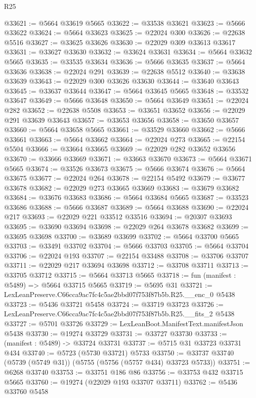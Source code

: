 \begin{lexlean}{R25}
\begin{coremodule}
@33621 := @5664 @33619 @5665
@33622 := @33538 @33621
@33623 := @5666 @33622
@33624 := @5664 @33623
@33625 := @22024 @300
@33626 := @22638 @5516
@33627 := @33625 @33626
@33630 := @22029 @309 @33613 @33617
@33631 := @33627 @33630
@33632 := @33624 @33631
@33634 := @5664 @33632 @5665
@33635 := @33535 @33634
@33636 := @5666 @33635
@33637 := @5664 @33636
@33638 := @22024 @291
@33639 := @22638 @5512
@33640 := @33638 @33639
@33643 := @22029 @300 @33626 @33630
@33644 := @33640 @33643
@33645 := @33637 @33644
@33647 := @5664 @33645 @5665
@33648 := @33532 @33647
@33649 := @5666 @33648
@33650 := @5664 @33649
@33651 := @22024 @282
@33652 := @22638 @5508
@33653 := @33651 @33652
@33656 := @22029 @291 @33639 @33643
@33657 := @33653 @33656
@33658 := @33650 @33657
@33660 := @5664 @33658 @5665
@33661 := @33529 @33660
@33662 := @5666 @33661
@33663 := @5664 @33662
@33664 := @22024 @273
@33665 := @22154 @5504
@33666 := @33664 @33665
@33669 := @22029 @282 @33652 @33656
@33670 := @33666 @33669
@33671 := @33663 @33670
@33673 := @5664 @33671 @5665
@33674 := @33526 @33673
@33675 := @5666 @33674
@33676 := @5664 @33675
@33677 := @22024 @264
@33678 := @22154 @5492
@33679 := @33677 @33678
@33682 := @22029 @273 @33665 @33669
@33683 := @33679 @33682
@33684 := @33676 @33683
@33686 := @5664 @33684 @5665
@33687 := @33523 @33686
@33688 := @5666 @33687
@33689 := @5664 @33688
@33690 := @22024 @217
@33693 := @22029 @221 @33512 @33516
@33694 := @20307 @33693
@33695 := @33690 @33694
@33698 := @22029 @264 @33678 @33682
@33699 := @33695 @33698
@33700 := @33689 @33699
@33702 := @5664 @33700 @5665
@33703 := @33491 @33702
@33704 := @5666 @33703
@33705 := @5664 @33704
@33706 := @22024 @193
@33707 := @22154 @33488
@33708 := @33706 @33707
@33711 := @22029 @217 @33694 @33698
@33712 := @33708 @33711
@33713 := @33705 @33712
@33715 := @5664 @33713 @5665
@33718 := fun (manifest : @5489) => @5664 @33715 @5665
@33719 := @5695 @31
@33721 := LexLeanPreserve.C66cca9ac7fc4c5ae2bbd07f753f87b5b.R25.__enc_0 @5438
@33723 := @5436 @33721 @5458
@33724 := @33719 @33723
@33726 := LexLeanPreserve.C66cca9ac7fc4c5ae2bbd07f753f87b5b.R25.__fits_2 @5438
@33727 := @5701 @33726
@33729 := LexLeanBoot.ManifestText.manifestJson @5438
@33730 := @19274 @33729
@33731 := @33727 @33730
@33733 := (manifest : @5489) -> @33724 @33731
@33737 := @5715 @31 @33723 @33731 @434
@33740 := @5723 (@5730 @33721) @5733
@33750 := @33737 @33740 (@5739 (@5749 @31)) (@5755 (@5756 (@5757 @434) @33723 @5733))
@33751 := @6268 @33740
@33753 := @33751 @186 @86
@33756 := @33753 @432 @33715 @5665
@33760 := @19274 (@22029 @193 @33707 @33711)
@33762 := @5436 @33760 @5458

\end{coremodule}
\end{lexlean}
